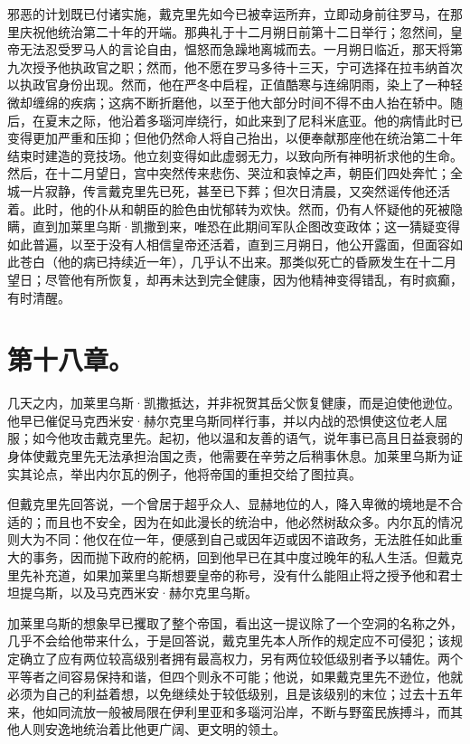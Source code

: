 邪恶的计划既已付诸实施，戴克里先如今已被幸运所弃，立即动身前往罗马，在那里庆祝他统治第二十年的开端。那典礼于十二月朔日前第十二日举行；忽然间，皇帝无法忍受罗马人的言论自由，愠怒而急躁地离城而去。一月朔日临近，那天将第九次授予他执政官之职；然而，他不愿在罗马多待十三天，宁可选择在拉韦纳首次以执政官身份出现。然而，他在严冬中启程，正值酷寒与连绵阴雨，染上了一种轻微却缠绵的疾病；这病不断折磨他，以至于他大部分时间不得不由人抬在轿中。随后，在夏末之际，他沿着多瑙河岸绕行，如此来到了尼科米底亚。他的病情此时已变得更加严重和压抑；但他仍然命人将自己抬出，以便奉献那座他在统治第二十年结束时建造的竞技场。他立刻变得如此虚弱无力，以致向所有神明祈求他的生命。然后，在十二月望日，宫中突然传来悲伤、哭泣和哀悼之声，朝臣们四处奔忙；全城一片寂静，传言戴克里先已死，甚至已下葬；但次日清晨，又突然谣传他还活着。此时，他的仆从和朝臣的脸色由忧郁转为欢快。然而，仍有人怀疑他的死被隐瞒，直到加莱里乌斯·凯撒到来，唯恐在此期间军队企图改变政体；这一猜疑变得如此普遍，以至于没有人相信皇帝还活着，直到三月朔日，他公开露面，但面容如此苍白（他的病已持续近一年），几乎认不出来。那类似死亡的昏厥发生在十二月望日；尽管他有所恢复，却再未达到完全健康，因为他精神变得错乱，有时疯癫，有时清醒。\par


\section{第十八章。}

几天之内，加莱里乌斯·凯撒抵达，并非祝贺其岳父恢复健康，而是迫使他逊位。他早已催促马克西米安·赫尔克里乌斯同样行事，并以内战的恐惧使这位老人屈服；如今他攻击戴克里先。起初，他以温和友善的语气，说年事已高且日益衰弱的身体使戴克里先无法承担治国之责，他需要在辛劳之后稍事休息。加莱里乌斯为证实其论点，举出内尔瓦的例子，他将帝国的重担交给了图拉真。\par

但戴克里先回答说，一个曾居于超乎众人、显赫地位的人，降入卑微的境地是不合适的；而且也不安全，因为在如此漫长的统治中，他必然树敌众多。内尔瓦的情况则大为不同：他仅在位一年，便感到自己或因年迈或因不谙政务，无法胜任如此重大的事务，因而抛下政府的舵柄，回到他早已在其中度过晚年的私人生活。但戴克里先补充道，如果加莱里乌斯想要皇帝的称号，没有什么能阻止将之授予他和君士坦提乌斯，以及马克西米安·赫尔克里乌斯。\par

加莱里乌斯的想象早已攫取了整个帝国，看出这一提议除了一个空洞的名称之外，几乎不会给他带来什么，于是回答说，戴克里先本人所作的规定应不可侵犯；该规定确立了应有两位较高级别者拥有最高权力，另有两位较低级别者予以辅佐。两个平等者之间容易保持和谐，但四个则永不可能；他说，如果戴克里先不逊位，他就必须为自己的利益着想，以免继续处于较低级别，且是该级别的末位；过去十五年来，他如同流放一般被局限在伊利里亚和多瑙河沿岸，不断与野蛮民族搏斗，而其他人则安逸地统治着比他更广阔、更文明的领土。\par

